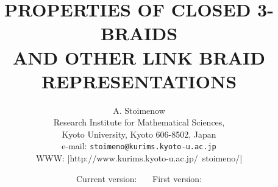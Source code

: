 \def\@curvepath#1#2#3{%
  \@ifempty{#2}{\piccurveto{#1 }{@stc}{@std}#3}%
    {\piccurveto{#1 }{#2 }{#2  #3  0.5 conv}
    \@curvepath{#3}}%
}
\def\curvepath#1#2#3{%
  \piccurve{#1 }{#2 }{#2 }{#2  #3  0.5 conv}%
  \picPSgraphics{/@stc [ #1  #2  -1 conv ] $ D /@std [ #1  ] $ D }%
  \@curvepath{#3}%
}

\def\@opencurvepath#1#2#3{%
  \@ifempty{#3}{\piccurveto{#1 }{#1 }{#2 }}%
    {\piccurveto{#1 }{#2 }{#2  #3  0.5 conv}\@opencurvepath{#3}}%
}
\def\opencurvepath#1#2#3{%
  \piccurve{#1 }{#2 }{#2 }{#2  #3  0.5 conv}%
  \@opencurvepath{#3}%
}


\author{A. Stoimenow\footnotemark[1]\\[2mm]
\small Research Institute for Mathematical Sciences, \\
\small Kyoto University, Kyoto 606-8502, Japan\\
\small e-mail: {\tt stoimeno@kurims.kyoto-u.ac.jp}\\
\small WWW: {\hbox{\web|http://www.kurims.kyoto-u.ac.jp/~stoimeno/|}}
}

{\def\thefootnote{\fnsymbol{footnote}}
}

\title{\large\bf \uppercase{Properties of closed 3-braids}\\
[1mm]\uppercase{and other link braid representations}\\
[4mm]
\phantom{\small\it This is a preprint. I would be grateful
for any comments and corrections %
!}}

\date{\large Current version: \curv\ \ \ First version:
}

\maketitle

\makeatletter

\let\vn\varnothing
\let\point\pt
\let\ay\asymp
\let\pa\partial
\let\ap\alpha
\let\bt\beta
\let\be\beta
\let\Dl\Delta
\let\Gm\Gamma
\let\gm\gamma
\let\de\delta
\let\dl\delta
\let\eps\epsilon
\let\lm\lambda
\let\Lm\Lambda
\let\sg\sigma
\let\vp\varphi
\let\zt\zeta
\let\om\omega
\let\diagram\diag
\let\nb\nabla
\let\prt\partial
\let\wh\widehat
\let\wt\widetilde
\def\tW{\wt W}
\let\sm\setminus
\let\tl\tilde
\def\inx{\mathop {\operator@font ind}}
\def\spn{\mathop {\operator@font span}\nolimits}
\def\dig{\mathop {\operator@font diag}}
\def\Mc{\max\cf}
\def\Md{\max\deg}
\def\md{\min\deg}
\def\mc{\min\cf}
\def\vol{\text{\rm vol}\,}
\def\Ra{\Rightarrow}
\def\Lra{\Longrightarrow}
\def\lra{\longrightarrow}
\def\so{\Rightarrow}
\def\So{\Longrightarrow}
\def\nin{\not\in}
\let\ds\displaystyle
\let\llra\longleftrightarrow
\let\reference\ref
\let\ol\overline
\let\ul\underline
\let\u\underline
\let\h\hat
\let\es\enspace
\def\lfra{\leftrightarrow}
\def\cf{\text{\rm cf}\,}

